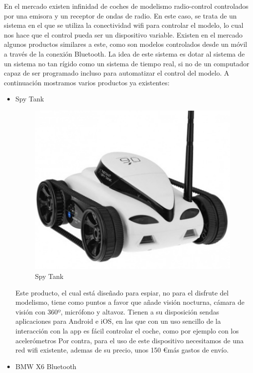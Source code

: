 \documentclass{pclass}
\begin{document}
En el mercado existen infinidad de coches de modelismo radio-control controlados por una emisora y un receptor de ondas de radio. En este caso, se trata de un sistema en el que se utiliza la conectividad wifi para controlar el modelo, lo cual nos hace que el control pueda ser un dispositivo variable. Existen en el mercado algunos productos similares a este, como son modelos controlados desde un móvil a través de la conexión Bluetooth. La idea de este sistema es dotar al sistema de un sistema no tan rígido como un sistema de tiempo real, si no de un computador capaz de ser programado incluso para automatizar el control del modelo. A continuación mostramos varios productos ya existentes:



\begin{itemize}
    \item Spy Tank


\begin{figure}[H]
  \centering
    \includegraphics[width=1.1\textwidth]{img/producto1}
  \caption{Spy Tank}
  \label{fig:SpyTank}
\end{figure}



Este producto, el cual está diseñado para espiar, no para el disfrute del modelismo, tiene como puntos a favor que añade visión nocturna, cámara de visión con 360º, micrófono y altavoz. Tienen a su disposición sendas aplicaciones para Android e iOS, en las que con un uso sencillo de la interacción con la app es fácil controlar el coche, como por ejemplo con los acelerómetros Por contra, para el uso de este dispositivo necesitamos de una red wifi existente, ademas de su precio, unos 150 \euro más gastos de envío.



    \item BMW X6 Bluetooth
\end{itemize}
\end{document}
